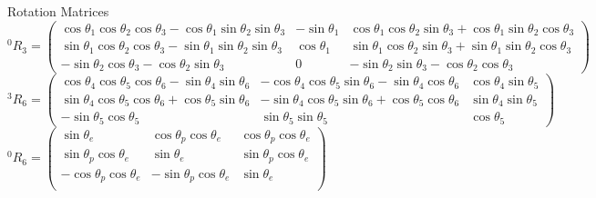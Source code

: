 \documentclass{article}
\begin{document}
Rotation Matrices
\bigskip\\
$
^{0}R_{3} = 
\begin{pmatrix}
	\cos\theta_{1} \cos\theta_{2} \cos\theta_{3} - \cos\theta_{1} \sin\theta_{2} \sin\theta_{3}
	& -\sin\theta_{1} &
	\cos\theta_{1} \cos\theta_{2} \sin\theta_{3} + \cos\theta_{1} \sin\theta_{2} \cos\theta_{3} \\
	\sin\theta_{1} \cos\theta_{2} \cos\theta_{3} - \sin\theta_{1} \sin\theta_{2} \sin\theta_{3}
	& \cos\theta_{1} &
	\sin\theta_{1} \cos\theta_{2} \sin\theta_{3} + \sin\theta_{1} \sin\theta_{2} \cos\theta_{3} \\
	- \sin\theta_{2} \cos\theta_{3} - \cos\theta_{2} \sin\theta_{3}
	& 0 &
	- \sin\theta_{2} \sin\theta_{3} - \cos\theta_{2} \cos\theta_{3}
\end{pmatrix}
$
\bigskip\\
$
^{3}R_{6} = 
\begin{pmatrix}
	\cos\theta_{4} \cos\theta_{5} \cos\theta_{6} - \sin\theta_{4} \sin\theta_{6} &
	- \cos\theta_{4} \cos\theta_{5} \sin\theta_{6} - \sin\theta_{4} \cos\theta_{6} &
	\cos\theta_{4} \sin\theta_{5} \\
	
	\sin\theta_{4} \cos\theta_{5} \cos\theta_{6} + \cos\theta_{5} \sin\theta_{6} &
	- \sin\theta_{4} \cos\theta_{5} \sin\theta_{6} + \cos\theta_{5} \cos\theta_{6} &
	\sin\theta_{4} \sin\theta_{5} \\
	
	- \sin\theta_{5} \cos\theta_{5} &
	\sin\theta_{5} \sin\theta_{5} &
	\cos\theta_{5}
\end{pmatrix}
$
\bigskip\\
$
^{0}R_{6} = 
\begin{pmatrix}
	\sin\theta_{e} &
	\cos\theta_{p} \cos\theta_{e} &
	\cos\theta_{p} \cos\theta_{e} \\
	
	\sin\theta_{p} \cos\theta_{e} &
	\sin\theta_{e} &
	\sin\theta_{p} \cos\theta_{e} \\
	
	- \cos\theta_{p} \cos\theta_{e} &
	- \sin\theta_{p} \cos\theta_{e} &
	\sin\theta_{e} \\
\end{pmatrix}
$
\end{document}

